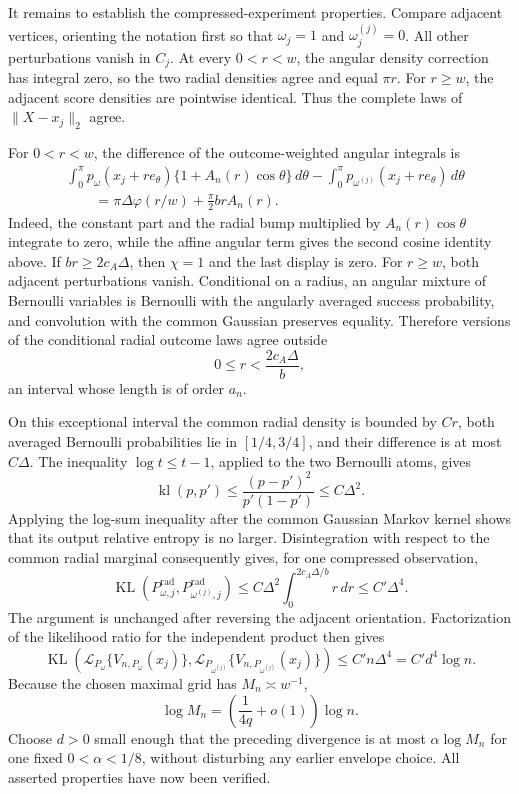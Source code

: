 It remains to establish the compressed-experiment properties.  Compare adjacent vertices, orienting the notation first so that \(\omega_j=1\) and \(\omega_j^{(j)}=0\).  All other perturbations vanish in \(C_j\).  At every \(0<r<w\), the angular density correction has integral zero, so the two radial densities agree and equal \(\pi r\).  For \(r\geq w\), the adjacent score densities are pointwise identical.  Thus the complete laws of \(\lVert X-x_j\rVert_2\) agree.

For \(0<r<w\), the difference of the outcome-weighted angular integrals is
\[
\begin{aligned}
 &\int_0^\pi p_\omega(x_j+re_\theta)
 \{1+A_n(r)\cos\theta\}\,d\theta
 -\int_0^\pi p_{\omega^{(j)}}(x_j+re_\theta)\,d\theta\\
 &\qquad=\pi\Delta\varphi(r/w)+\frac\pi2brA_n(r).
\end{aligned}
\]
Indeed, the constant part and the radial bump multiplied by \(A_n(r)\cos\theta\) integrate to zero, while the affine angular term gives the second cosine identity above.  If \(br\geq2c_A\Delta\), then \(\chi=1\) and the last display is zero.  For \(r\geq w\), both adjacent perturbations vanish.  Conditional on a radius, an angular mixture of Bernoulli variables is Bernoulli with the angularly averaged success probability, and convolution with the common Gaussian preserves equality.  Therefore versions of the conditional radial outcome laws agree outside
\[
 0\leq r<\frac{2c_A\Delta}{b},
\]
an interval whose length is of order \(a_n\).

On this exceptional interval the common radial density is bounded by \(Cr\), both averaged Bernoulli probabilities lie in \([1/4,3/4]\), and their difference is at most \(C\Delta\).  The inequality \(\log t\leq t-1\), applied to the two Bernoulli atoms, gives
\[
 \operatorname{kl}(p,p')
 \leq\frac{(p-p')^2}{p'(1-p')}
 \leq C\Delta^2.
\]
Applying the log-sum inequality after the common Gaussian Markov kernel shows that its output relative entropy is no larger.  Disintegration with respect to the common radial marginal consequently gives, for one compressed observation,
\[
 \operatorname{KL}(P^{\mathrm{rad}}_{\omega,j},P^{\mathrm{rad}}_{\omega^{(j)},j})
 \leq C\Delta^2\int_0^{2c_A\Delta/b}r\,dr
 \leq C'\Delta^4.
\]
The argument is unchanged after reversing the adjacent orientation.  Factorization of the likelihood ratio for the independent product then gives
\[
 \operatorname{KL}\!\left(
 \mathcal L_{P_\omega}\{V_{n,P_\omega}(x_j)\},
 \mathcal L_{P_{\omega^{(j)}}}\{V_{n,P_{\omega^{(j)}}}(x_j)\}
 \right)
 \leq C'n\Delta^4=C'd^4\log n.
\]
Because the chosen maximal grid has \(M_n\asymp w^{-1}\),
\[
 \log M_n=\left(\frac{1}{4q}+o(1)\right)\log n.
\]
Choose \(d>0\) small enough that the preceding divergence is at most \(\alpha\log M_n\) for one fixed \(0<\alpha<1/8\), without disturbing any earlier envelope choice.  All asserted properties have now been verified.